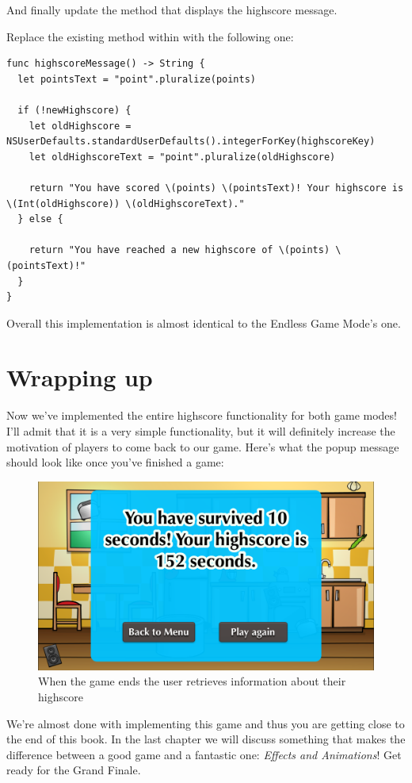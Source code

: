And finally update the method that displays the highscore message.
\begin{leftbar}
Replace the existing  method within
 with the following one:
\begin{lstlisting}
func highscoreMessage() -> String {
  let pointsText = "point".pluralize(points)
  
  if (!newHighscore) {
    let oldHighscore = NSUserDefaults.standardUserDefaults().integerForKey(highscoreKey)
    let oldHighscoreText = "point".pluralize(oldHighscore)
    
    return "You have scored \(points) \(pointsText)! Your highscore is \(Int(oldHighscore)) \(oldHighscoreText)."
  } else {
    
    return "You have reached a new highscore of \(points) \(pointsText)!"
  }
}
\end{lstlisting}
\end{leftbar}
Overall this implementation is almost identical to the Endless Game Mode's one.

\section{Wrapping up}

Now we've implemented the entire highscore functionality for both game modes!
I'll admit that it is a very simple functionality, but it will definitely
increase the motivation of players to come back to our game. Here's what the
popup message should look like once you've finished a game:

\begin{figure}[H]
    \centering
    \includegraphics[width=0.6\linewidth]{images/Chapter8/Highscore_Message.png}
    \caption{When the game ends the user retrieves information about their
    highscore}
\end{figure}

We're almost done with implementing this game and thus you are getting close to
the end of this book. In the last chapter we will discuss something that makes
the difference between a good game and a fantastic one: \textit{Effects and
Animations}! Get ready for the Grand Finale.
